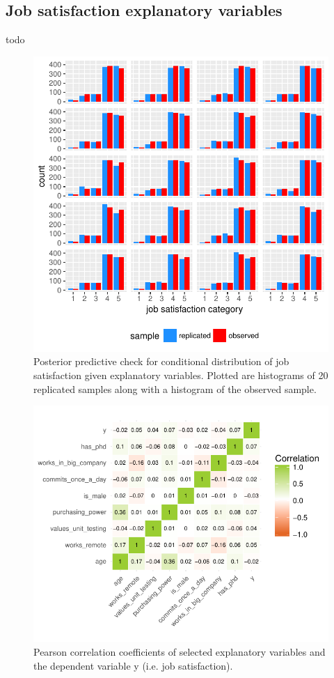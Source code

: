 \documentclass{article}
\begin{document}
\subsection{Job satisfaction explanatory variables}
todo





\begin{figure}[H]
\centering
\includegraphics{report-017}
\caption{Posterior predictive check for conditional distribution of job satisfaction given explanatory variables. Plotted are histograms of 20 replicated samples along with a histogram of the observed sample.}\label{fig_3}
\end{figure}


\begin{figure}[H]
\centering
\includegraphics{report-019}
\caption{Pearson correlation coefficients of selected explanatory variables and the dependent variable y (i.e. job satisfaction).}\label{fig_4}
\end{figure}
\end{document}
